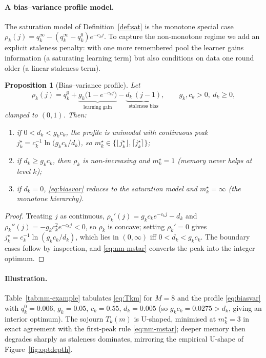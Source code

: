 \documentclass[11pt,a4paper]{article}
\newtheorem{proposition}[theorem]{Proposition}
\begin{document}
\paragraph{A bias--variance profile model.}

The saturation model of Definition~\ref{def:sat} is the monotone special
case $\rho_k(j)=q_k^\infty-(q_k^\infty-q_k^0)e^{-c_kj}$.  To capture the
non-monotone regime we add an explicit staleness penalty: with one more
remembered pool the learner gains information (a saturating learning
term) but also conditions on data one round older (a linear staleness
term).

\begin{proposition}[Bias--variance profile]\label{prop:nm-biasvar}
  Let
  \begin{equation}
    \rho_k(j)=q_k^0+\underbrace{g_k\bigl(1-e^{-c_kj}\bigr)}_{\text{learning gain}}
              -\underbrace{d_k\,(j-1)}_{\text{staleness bias}},
    \qquad g_k,c_k>0,\ d_k\ge0,
    \label{eq:biasvar}
  \end{equation}
  clamped to $(0,1)$.  Then:
  \begin{enumerate}[label=(\alph*),nosep]
  \item if $0<d_k<g_kc_k$, the profile is unimodal with continuous peak
    $j_k^\star=c_k^{-1}\ln\!\bigl(g_kc_k/d_k\bigr)$, so
    $m_k^\star\in\{\lfloor j_k^\star\rfloor,\lceil j_k^\star\rceil\}$;
  \item if $d_k\ge g_kc_k$, then $\rho_k$ is non-increasing and
    $m_k^\star=1$ (memory never helps at level $k$);
  \item if $d_k=0$, \eqref{eq:biasvar} reduces to the saturation model
    and $m_k^\star=\infty$ (the monotone hierarchy).
  \end{enumerate}
\end{proposition}

\begin{proof}
  Treating $j$ as continuous, $\rho_k'(j)=g_kc_ke^{-c_kj}-d_k$ and
  $\rho_k''(j)=-g_kc_k^2e^{-c_kj}<0$, so $\rho_k$ is concave; setting
  $\rho_k'=0$ gives $j_k^\star=c_k^{-1}\ln(g_kc_k/d_k)$, which lies in
  $(0,\infty)$ iff $0<d_k<g_kc_k$.  The boundary cases follow by
  inspection, and \eqref{eq:nm-mstar} converts the peak into the integer
  optimum.
\end{proof}

\paragraph{Illustration.}
Table~\ref{tab:nm-example} tabulates \eqref{eq:Tkm} for $M=8$ and the profile
\eqref{eq:biasvar} with $q_k^0=0.006$, $g_k=0.05$, $c_k=0.55$,
$d_k=0.005$ (so $g_kc_k=0.0275>d_k$, giving an interior optimum).  The
sojourn $T_k(m)$ is U-shaped, minimised at $m_k^\star=3$ in exact
agreement with the first-peak rule \eqref{eq:nm-mstar}; deeper memory
then degrades sharply as staleness dominates, mirroring the empirical
U-shape of Figure~\ref{fig:optdepth}.
\end{document}
